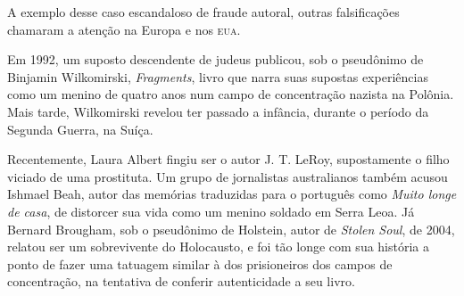 A exemplo desse caso escandaloso de fraude autoral, outras falsificações
chamaram a atenção na Europa e nos \textsc{eua}.

Em 1992, um suposto descendente de judeus publicou, sob o pseudônimo de
Binjamin Wilkomirski, \emph{Fragments}, livro que narra suas supostas
experiências como um menino de quatro anos num campo de concentração
nazista na Polônia. Mais tarde, Wilkomirski revelou ter passado a
infância, durante o período da Segunda Guerra, na Suíça.

Recentemente, Laura Albert fingiu ser o autor J. T. LeRoy, supostamente
o filho viciado de uma prostituta. Um grupo de jornalistas australianos
também acusou Ishmael Beah, autor das memórias traduzidas para o
português como \emph{Muito longe de casa}, de distorcer sua vida como um
menino soldado em Serra Leoa. Já Bernard Brougham, sob o pseudônimo de
Holstein, autor de \emph{Stolen Soul}, de 2004, relatou ser um
sobrevivente do Holocausto, e foi tão longe com sua história a ponto de
fazer uma tatuagem similar à dos prisioneiros dos campos de
concentração, na tentativa de conferir autenticidade a seu livro.

